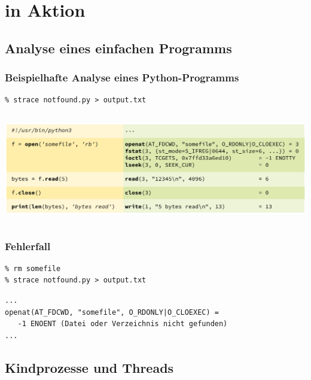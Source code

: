 \section{\strace{} in Aktion}

\subsection{Analyse eines einfachen Programms}

\begin{frame}[t,fragile]
  \frametitle{Beispielhafte Analyse eines Python-Programms}

  \begin{lstlisting}
% strace notfound.py > output.txt
  \end{lstlisting}

  \centering
  \begin{columns}
    \column{\dimexpr\paperwidth}
    \includegraphics[width=\paperwidth]{../images/sample-listing.pdf}
  \end{columns}

\end{frame}

\begin{frame}[t,fragile]
  \frametitle{Fehlerfall}

  \begin{lstlisting}
% rm somefile 
% strace notfound.py > output.txt
  \end{lstlisting}

  \begin{exampleblock}{\vspace*{-2ex}}
  \begin{lstlisting}
...
openat(AT_FDCWD, "somefile", O_RDONLY|O_CLOEXEC) = 
   -1 ENOENT (Datei oder Verzeichnis nicht gefunden)
...
  \end{lstlisting}
  \end{exampleblock}


\end{frame}

\subsection{Kindprozesse und Threads}


